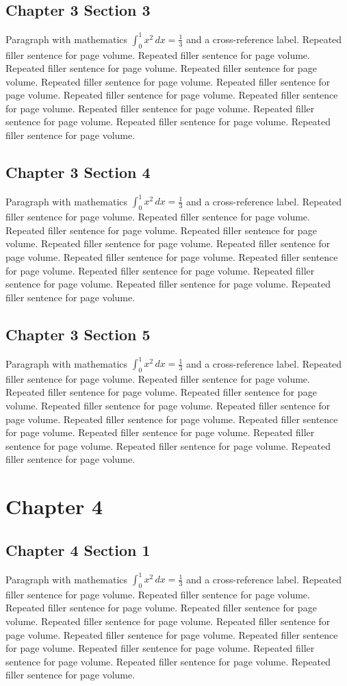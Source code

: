 \documentclass[11pt]{report}
\begin{document}
\section{Chapter 3 Section 3}
Paragraph with mathematics $\int_0^1 x^2\,dx = \frac13$ and a cross-reference label.
\label{sec:3:3}
Repeated filler sentence for page volume. Repeated filler sentence for page volume. Repeated filler sentence for page volume. Repeated filler sentence for page volume. Repeated filler sentence for page volume. Repeated filler sentence for page volume. Repeated filler sentence for page volume. Repeated filler sentence for page volume. Repeated filler sentence for page volume. Repeated filler sentence for page volume. Repeated filler sentence for page volume. Repeated filler sentence for page volume. 
\section{Chapter 3 Section 4}
Paragraph with mathematics $\int_0^1 x^2\,dx = \frac13$ and a cross-reference label.
\label{sec:3:4}
Repeated filler sentence for page volume. Repeated filler sentence for page volume. Repeated filler sentence for page volume. Repeated filler sentence for page volume. Repeated filler sentence for page volume. Repeated filler sentence for page volume. Repeated filler sentence for page volume. Repeated filler sentence for page volume. Repeated filler sentence for page volume. Repeated filler sentence for page volume. Repeated filler sentence for page volume. Repeated filler sentence for page volume. 
\section{Chapter 3 Section 5}
Paragraph with mathematics $\int_0^1 x^2\,dx = \frac13$ and a cross-reference label.
\label{sec:3:5}
Repeated filler sentence for page volume. Repeated filler sentence for page volume. Repeated filler sentence for page volume. Repeated filler sentence for page volume. Repeated filler sentence for page volume. Repeated filler sentence for page volume. Repeated filler sentence for page volume. Repeated filler sentence for page volume. Repeated filler sentence for page volume. Repeated filler sentence for page volume. Repeated filler sentence for page volume. Repeated filler sentence for page volume. 
\chapter{Chapter 4}
\section{Chapter 4 Section 1}
Paragraph with mathematics $\int_0^1 x^2\,dx = \frac13$ and a cross-reference label.
\label{sec:4:1}
Repeated filler sentence for page volume. Repeated filler sentence for page volume. Repeated filler sentence for page volume. Repeated filler sentence for page volume. Repeated filler sentence for page volume. Repeated filler sentence for page volume. Repeated filler sentence for page volume. Repeated filler sentence for page volume. Repeated filler sentence for page volume. Repeated filler sentence for page volume. Repeated filler sentence for page volume. Repeated filler sentence for page volume. 
\end{document}
